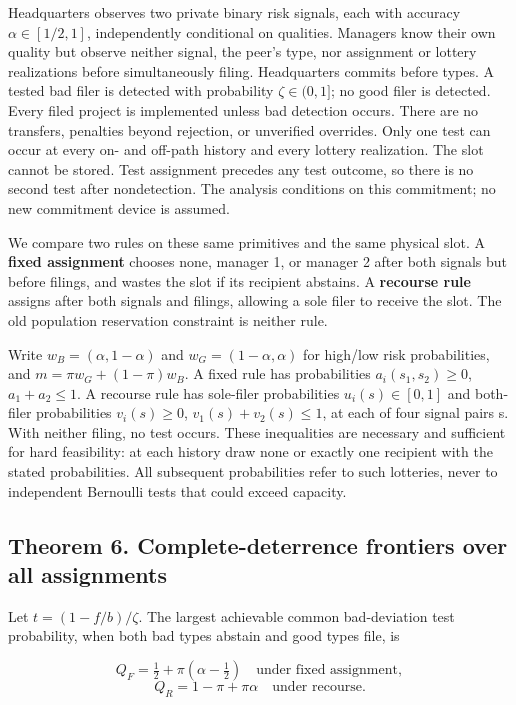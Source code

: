 \documentclass[
  11pt,
]{article}
\begin{document}
Headquarters observes two private binary risk signals, each with
accuracy \(\alpha\in[1/2,1]\), independently conditional on qualities.
Managers know their own quality but observe neither signal, the peer's
type, nor assignment or lottery realizations before simultaneously
filing. Headquarters commits before types. A tested bad filer is
detected with probability \(\zeta\in(0,1]\); no good filer is detected.
Every filed project is implemented unless bad detection occurs. There
are no transfers, penalties beyond rejection, or unverified overrides.
Only one test can occur at every on- and off-path history and every
lottery realization. The slot cannot be stored. Test assignment precedes
any test outcome, so there is no second test after nondetection. The
analysis conditions on this commitment; no new commitment device is
assumed.

We compare two rules on these same primitives and the same physical
slot. A \textbf{fixed assignment} chooses none, manager 1, or manager 2
after both signals but before filings, and wastes the slot if its
recipient abstains. A \textbf{recourse rule} assigns after both signals
and filings, allowing a sole filer to receive the slot. The old
population reservation constraint is neither rule.

Write \(w_B=(\alpha,1-\alpha)\) and \(w_G=(1-\alpha,\alpha)\) for
high/low risk probabilities, and \(m=\pi w_G+(1-\pi)w_B\). A fixed rule
has probabilities \(a_i(s_1,s_2)\geq0\), \(a_1+a_2\leq1\). A recourse
rule has sole-filer probabilities \(u_i(s)\in[0,1]\) and both-filer
probabilities \(v_i(s)\geq0\), \(v_1(s)+v_2(s)\leq1\), at each of four
signal pairs s. With neither filing, no test occurs. These inequalities
are necessary and sufficient for hard feasibility: at each history draw
none or exactly one recipient with the stated probabilities. All
subsequent probabilities refer to such lotteries, never to independent
Bernoulli tests that could exceed capacity.

\subsection{Theorem 6. Complete-deterrence frontiers over all
assignments}\label{theorem-6.-complete-deterrence-frontiers-over-all-assignments}

Let \(t=(1-f/b)/\zeta\). The largest achievable common bad-deviation
test probability, when both bad types abstain and good types file, is

\[Q_F=\tfrac12+\pi(\alpha-\tfrac12)\quad\text{under fixed assignment},\]
\[Q_R=1-\pi+\pi\alpha\quad\text{under recourse}.\]
\end{document}
